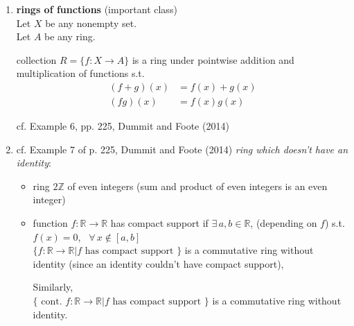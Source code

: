 \begin{enumerate}
Similarly define \emph{rational} Hamiltonian Quaternions ring by taking $a,b,c,d\in \mathbb{Q}$.  

real and rational Hamiltonian Quaternions both are divison rings, where inverse of nonzero element defined as 


\begin{equation}
(a+bi +cj + dk)^{-1} = \frac{ a-bi -cj -dk}{ a^2 + b^2 + c^2 + d^2 }
\end{equation} cf. Example 5, pp. 224, Dummit and Foote (2014)\cite{agat:DuFo2003}

\item \textbf{rings of functions} (important class) \\
Let $X$ be any nonempty set. \\
Let $A$ be any ring. 

\begin{definition}
	collection $R= \lbrace f:X\to A \rbrace$ is a ring under pointwise addition and multiplication of functions s.t. 
	\begin{equation}
	\begin{aligned}
	(f+g)(x) & = f(x) + g(x) \\
	(fg)(x) & = f(x)g(x)
	\end{aligned}
	\end{equation}
\end{definition}
	
cf. Example 6, pp. 225, Dummit and Foote (2014)\cite{agat:DuFo2003}

\item cf. Example 7 of p. 225, Dummit and Foote (2014)\cite{agat:DuFo2003} \emph{ring which doesn't have an identity}:

\begin{itemize}
	\item  ring $2\mathbb{Z}$ of even integers (sum and product of even integers is an even integer) \\
\item function $f: \mathbb{R} \to \mathbb{R}$ has compact support if $\exists \, a, b \in \mathbb{R}$, (depending on $f$) s.t. $f(x) = 0$, \quad \, $\forall \, x \notin [a,b]$ \\
$\lbrace f: \mathbb{R}\to \mathbb{R} | f \text{ has compact support } \rbrace$ is a commutative ring without identity (since an identity couldn't have compact support), 

Similarly, \\
$\lbrace \text{ cont. } f : \mathbb{R} \to \mathbb{R} | f \text{ has compact support } \rbrace$ is a commutative ring without identity. 
\end{itemize}	
\end{enumerate}

